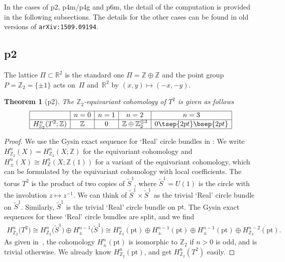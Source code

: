\documentclass[pdftex]{sigma}
\newtheorem{thm}{Theorem}[section]
\theoremstyle{definition}
\newcommand{\R}{\mathbb{R}}
\newcommand{\Z}{\mathbb{Z}}
\newcommand{\pt}{\mathrm{pt}}
\begin{document}
In the cases of \textsf{p2}, \textsf{p4m/p4g} and \textsf{p6m}, the detail of the computation is provided in the following subsections. The details for the other cases can be found in old versions of \verb|arXiv:1509.09194|.

\subsection{\textsf{p2}}

The lattice $\Pi \subset \R^2$ is the standard one $\Pi = \Z \oplus \Z$ and the point group $P = \Z_2 = \{ \pm 1 \}$ acts on~$\Pi$ and~$\R^2$ by $(x, y) \mapsto (-x, -y)$.

\begin{thm}[\textsf{p2}] \label{thm:p2}
The $\Z_2$-equivariant cohomology of $T^2$ is given as follows
$$
\begin{array}{|c|c|c|c|c|}
\hline
& n = 0 & n = 1 & n = 2 & n = 3 \\
\hline
H^n_{\Z_2}(T^2; \Z) & \Z & 0 & \Z \oplus \Z_2^{\oplus 3} & 0 \tsep{2pt}\bsep{2pt}\\
\hline
\end{array}
$$
\end{thm}

\begin{proof}
We use the Gysin exact sequence for `Real' circle bundles in \cite{G}: We write $H^n_{\Z_2}(X) = H^n_{\Z_2}(X; \Z)$ for the equivariant cohomology and $H^n_{\pm}(X) \cong H^n_{\Z}(X; \Z(1))$ for a variant of the equivariant cohomology, which can be formulated by the equivariant cohomology with local coef\/f\/icients. The torus $T^2$ is the product of two copies of $\tilde{S}^1$, where $\tilde{S}^1 = U(1)$ is the circle with the involution $z \mapsto z^{-1}$. We can think of $\tilde{S}^1 \times \tilde{S}^1$ as the trivial `Real' circle bundle on $\tilde{S}^1$. Similarly, $\tilde{S}^1$ is the trivial `Real' circle bundle on $\pt$. The Gysin exact sequences for these `Real' circle bundles are split, and we f\/ind
\begin{gather*}
H^n_{\Z_2}\big(T^2\big)
\cong H^n_{\Z_2}\big(\tilde{S}^1\big) \oplus H^{n-1}_{\pm}\big(\tilde{S}^1\big) \cong H^n_{\Z_2}(\pt) \oplus H^{n-1}_{\pm}(\pt)
\oplus H^{n-1}_{\pm}(\pt) \oplus H^{n-2}_{\Z_2}(\pt).
\end{gather*}
As given in~\cite{G}, the cohomology $H^n_{\pm}(\pt)$ is isomorphic to $\Z_2$ if $n > 0$ is odd, and is trivial otherwise. We already know $H^n_{\Z_2}(\pt)$, and get $H^n_{\Z_2}(T^2)$ easily.
\end{proof}
\end{document}
